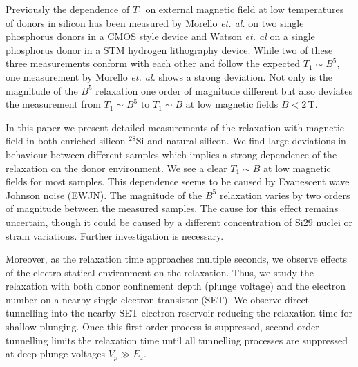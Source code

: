 Previously the dependence of $T_1$ on external magnetic field at low temperatures of donors in silicon has been measured by Morello \textit{et. al.} \cite{Morello2010} on two single phosphorus donors in a CMOS style device and Watson \textit{et. al} \cite{Watson2015} on a single phosphorus donor in a STM hydrogen lithography device. While two of these three measurements conform with each other and follow the expected $T_1\sim B^5$, one measurement by Morello \textit{et. al.} shows a strong deviation. Not only is the magnitude of the $B^5$ relaxation one order of magnitude different but also deviates the measurement from $T_1\sim B^5$ to $T_1\sim B$ at low magnetic fields $B<2\,$T.  

In this paper we present detailed measurements of the relaxation with magnetic field in both enriched silicon $^{28}$Si and natural silicon. We find large deviations in behaviour between different samples which implies a strong dependence of the relaxation on the donor environment. We see a clear $T_1\sim B$ at low magnetic fields for most samples. This dependence seems to be caused by Evanescent wave Johnson noise (EWJN). The magnitude of the $B^5$ relaxation varies by two orders of magnitude between the measured samples. The cause for this effect remains uncertain, though it could be caused by a different concentration of Si29 nuclei or strain variations. Further investigation is necessary. 

Moreover, as the relaxation time approaches multiple seconds, we observe effects of the electro-statical environment on the relaxation. Thus, we study the relaxation with both donor confinement depth (plunge voltage) and the electron number on a nearby single electron transistor (SET). We observe direct tunnelling into the nearby SET electron reservoir reducing the relaxation time for shallow plunging. Once this first-order process is suppressed, second-order tunnelling limits the relaxation time until all tunnelling processes are suppressed at deep plunge voltages $V_p\gg E_z$.


